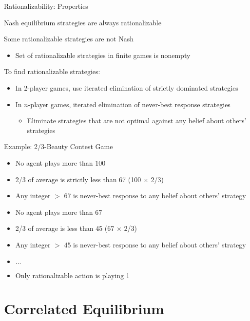 \documentclass[11pt,aspectratio=169,handout]{beamer}
\begin{document}
  \begin{frame}{Rationalizability: Properties}
   \begin{itemizes}
    \item Nash equilibrium strategies are always rationalizable
    \item<+-> Some rationalizable strategies are not Nash
    \begin{itemize}
     \item Set of rationalizable strategies in finite games is nonempty
    \end{itemize}
    \item<+-> To find rationalizable strategies:
    \begin{itemize}
     \setlength{\itemsep}{1.1em}
     \item<+-> In \alert{2-player} games, use iterated elimination of strictly dominated strategies
     \item<+-> In \alert{$n$-player} games, iterated elimination of \alert{never-best response} strategies
     \begin{itemize}
      \item Eliminate strategies that are not optimal against any belief about others' strategies
     \end{itemize}
    \end{itemize}
   \end{itemizes}
  \end{frame}
  
  \begin{frame}{Example: 2/3-Beauty Contest Game}
   \begin{itemize}[<+->]
    \item No agent plays more than 100
    \item 2/3 of average is strictly less than 67 (100 $\times$ 2/3)
    \item Any integer $>$ 67 is never-best response to any belief about others' strategy
    \item No agent plays more than 67
    \item 2/3 of average is less than 45 (67 $\times$ 2/3)
    \item Any integer $>$ 45 is never-best response to any belief about others' strategy
    \item $\dots$
    \item Only rationalizable action is playing 1
   \end{itemize}
  \end{frame}
 
 \section{Correlated Equilibrium}
\end{document}
